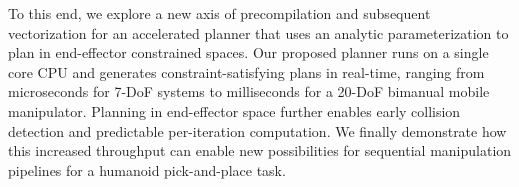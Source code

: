\documentclass[letterpaper, 10 pt, conference]{ieeeconf}
\begin{document}

To this end, we explore a new axis of precompilation and subsequent vectorization for an accelerated planner that uses an analytic parameterization to plan in end-effector constrained spaces. Our proposed planner runs on a single core CPU and generates constraint-satisfying plans in real-time, ranging from microseconds for 7-DoF systems to milliseconds for a 20-DoF bimanual mobile manipulator. Planning in end-effector space further enables early collision detection and predictable per-iteration computation. We finally demonstrate how this increased throughput can enable new possibilities for sequential manipulation pipelines for a humanoid pick-and-place task. 

\end{document}
